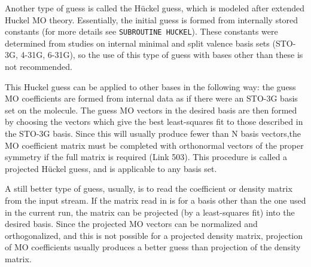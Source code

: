 Another type of guess is called the H\"{u}ckel guess, which is modeled
after extended Huckel MO theory.  Essentially, the initial guess is
formed from internally stored constants (for more details see
{\tt SUBROUTINE  HUCKEL}).  These constants were determined from studies on
internal minimal and split valence basis sets (STO-3G, 4-31G, 6-31G),
so the use of this type of guess with bases other than these is not
recommended.

This Huckel guess can be applied to other bases in the following
way:  the guess MO coefficients are formed from internal data as if
there were an STO-3G basis set on the molecule.  The guess MO vectors
in the desired basis are then formed by choosing the vectors which give
the best least-squares fit to those described in the STO-3G basis.
Since this will usually produce fewer than N basis vectors,the MO
coefficient matrix must be completed with orthonormal vectors of the
proper symmetry if the full matrix is required (Link 503).  This
procedure is called a projected H\"{u}ckel guess, and is applicable to any
basis set.

A still better type of guess, usually, is to read the coefficient
or density matrix from the input stream.  If the matrix read in is for a basis
other than the one used in the current run, the matrix can be projected
(by a least-squares fit) into the desired basis.  Since the projected
MO vectors can be normalized and orthogonalized, and this is not
possible for a projected density matrix, projection of MO coefficients
usually produces a better guess than projection of the density matrix.
